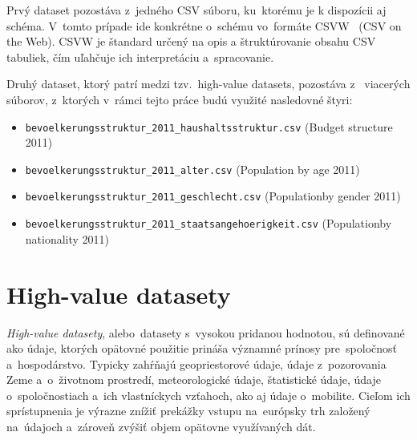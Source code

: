 Prvý dataset pozostáva z~jedného CSV súboru, ku~ktorému je k dispozícii aj schéma. V~tomto prípade ide konkrétne o~schému vo~formáte CSVW~\cite{csvw} (CSV on the Web). CSVW je štandard určený na opis a štruktúrovanie obsahu CSV tabuliek, čím uľahčuje ich interpretáciu a~spracovanie.

Druhý dataset, ktorý patrí medzi tzv.~high-value datasets, pozostáva z~ viacerých súborov, z~ktorých v~rámci tejto práce budú využité nasledovné štyri:
\begin{itemize}
\item \texttt{bevoelkerungsstruktur\_2011\_haushaltsstruktur.csv} (Budget struc\-tu\-re 2011)
\item \texttt{bevoelkerungsstruktur\_2011\_alter.csv} (Population by age 2011)
\item \texttt{bevoelkerungsstruktur\_2011\_geschlecht.csv} (Po\-pu\-la\-ti\-on\newline by gen\-der 2011)
\item \texttt{bevoelkerungsstruktur\_2011\_staatsangehoerigkeit.csv} (Po\-pu\-la\-ti\-on\newline by na\-ti\-o\-na\-li\-ty 2011)
\end{itemize}

\section{High-value datasety}

\textit{High-value datasety}\cite{highvaluedatasets}, alebo~datasety s~vysokou pridanou hodnotou, sú definované ako údaje, ktorých opätovné použitie prináša významné prínosy pre~spoločnosť a~hospodárstvo. Typicky zahŕňajú geopriestorové údaje, údaje z~pozorovania Zeme a~o~životnom prostredí, meteorologické údaje, štatistické údaje, údaje o~spoločnostiach a~ich vlastníckych vzťahoch, ako aj údaje o~mobilite. Cieľom ich sprístupnenia je výrazne znížiť prekážky vstupu na~európsky trh založený na~údajoch a~zároveň zvýšiť objem opätovne využívaných dát.

